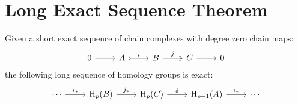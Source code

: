 \section{Long Exact Sequence Theorem}

\begin{theorem}
\label{thm:long-exact-sequence}
Given a short exact sequence of chain complexes with degree zero chain maps:
\[
\begin{tikzcd}
0 \ar[r]
&A \ar[r, tail, "i"]
&B \ar[r, two heads, "j"]
&C \ar[r]
&0
\end{tikzcd}
\]
the following long sequence of homology groups is exact:
\[
\begin{tikzcd}
\cdots \ar[r, "i_{*}"]
&\Hmlg_p(B) \ar[r, "j_{*}"]
&\Hmlg_p(C) \ar[r, "\delta"]
&\Hmlg_{p-1}(A) \ar[r, "i_{*}"]
&\cdots
\end{tikzcd}
\]
\end{theorem}


